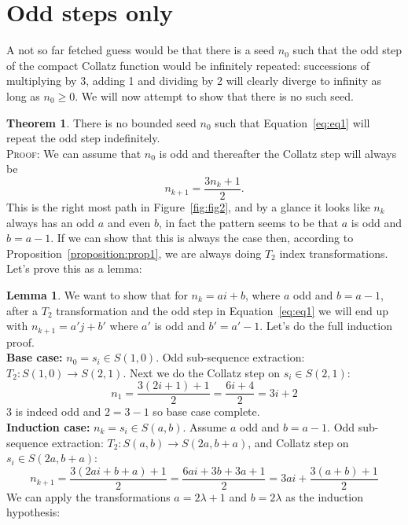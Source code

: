 \documentclass{article}
\theoremstyle{definition}
\newtheorem{theorem}{Theorem}[section]
\newtheorem{lemma}{Lemma}[section]
\begin{document}
\section{Odd steps only}
A not so far fetched guess would be that there is a seed $n_0$ such that the odd step of the compact Collatz function would be infinitely repeated: successions of multiplying by 3, adding 1 and dividing by 2 will clearly diverge to infinity as long as $n_0\geq0$. We will now attempt to show that there is no such seed.
%
\begin{theorem}\label{theorem:thm1}
There is no bounded seed $n_0$ such that Equation~\ref{eq:eq1} will repeat the odd step indefinitely.
%
\\[.2cm]
%
\textsc{Proof:} We can assume that $n_0$ is odd and thereafter the Collatz step will always be
\begin{equation*}
    n_{k+1} = \frac{3n_k + 1}{2}.
\end{equation*}
This is the right most path in Figure~\ref{fig:fig2}, and by a glance it looks like $n_k$ always has an odd $a$ and even $b$, in fact the pattern seems to be that $a$ is odd and $b=a-1$. If we can show that this is always the case then, according to Proposition~\ref{proposition:prop1}, we are always doing $T_2$ index transformations. Let's prove this as a lemma:
%
\begin{lemma}
We want to show that for $n_k = ai+b$, where $a$ odd and $b=a-1$, after a $T_2$ transformation and the odd step in Equation~\ref{eq:eq1} we will end up with $n_{k+1}=a'j+b'$ where $a'$ is odd and $b'=a'-1$. Let's do the full induction proof.
%
\\[.2cm]
%
\textbf{Base case:} $n_0 = s_i \in S(1,0)$. Odd sub-sequence extraction: $T_2: S(1,0) \longrightarrow S(2,1)$. Next we do the Collatz step on $s_i\in S(2,1)$:
\begin{equation*}
    n_1 = \frac{3(2i+1)+1}{2} = \frac{6i+4}{2} = 3i+2
\end{equation*}
3 is indeed odd and $2=3-1$ so base case complete.
%
\\[.2cm]
%
\textbf{Induction case:} $n_k = s_i \in S(a,b)$. Assume $a$ odd and $b=a-1$. Odd sub-sequence extraction: $T_2: S(a,b) \longrightarrow S(2a, b+a)$, and Collatz step on $s_i \in S(2a,b+a)$:
\begin{equation*}
    n_{k+1} = \frac{3(2ai+b+a)+1}{2} = \frac{6ai+3b+3a+1}{2} = 3ai + \frac{3(a+b)+1}{2}
\end{equation*}
We can apply the transformations $a=2\lambda+1$ and $b=2\lambda$ as the induction hypothesis:

\end{lemma}
\end{theorem}
\end{document}
